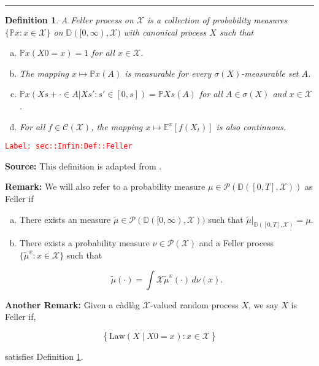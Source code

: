 \documentclass[12pt]{article}
\newcommand{\mb}{\mathbb}
\newcommand{\mc}{\mathcal}
\newcommand{\te}{\text}
\newcommand{\tr}{\textcolor{red}}
\newcommand{\labe}[1]{\tr{\texttt{Label: #1}}}
\newcommand{\lin}{\rule{\linewidth}{0.4 pt}}
\newcommand{\pr}{\mb{P}}							%
\newcommand{\exmu}[2]{\mb{E}^{#1}\left[#2\right]}	%
\newcommand{\cad}{\mb{D}}							%
\newcommand{\T}{T}								%
\newcommand{\x}{x}								%
\renewcommand{\t}{t}							%
\renewcommand{\tt}{s}							%
\newcommand{\ttt}{s'}							%
\newcommand{\X}{X}								%
\newcommand{\f}{f}								%
\newcommand{\cind}[1]{_{#1}}					%
\newcommand{\tip}[1]{#1}						%
\newcommand{\cont}{\mc{C}}						%
\newcommand{\alt}[1]{\widetilde{#1}}			%
\newcommand{\m}{\mu}							%
\newcommand{\mm}{\nu}							%
\newcommand{\law}{\te{Law}}						%
\newcommand{\typset}{A}							%
\newcommand{\spce}{\mc{X}}						%
\newtheorem{defn}[thms]{Definition}
\begin{document}
\lin

\begin{defn}
A Feller process on \(\spce\) is a collection of probability measures \(\{\pr{\x}:\x \in \spce\}\) on \(\cad([0,\infty),\spce)\) with canonical process \(\X\) such that

\begin{enumerate}[(a)]
\item \(\pr{\x}(\X{}{0} = \x) = 1\) for all \(\x \in \spce\).

\item The mapping \(\x \mapsto \pr{\x}(\typset)\) is measurable for every \(\sigma(\X)\)-measurable set \(\typset\).

\item \(\pr{\x}(\X{}{\tt+\cdot} \in \typset|\X{}{\ttt}:\ttt \in [0,\tt]) = \pr{\X{}{\tt}}(\typset)\) for all \(\typset \in \sigma(\X)\) and \(\x \in \spce\).

\item For all \(\f\in \cont(\spce)\), the mapping \(\x\mapsto \exmu{\x}{\f(\X_{\t})}\) is also continuous.
\end{enumerate}
\label{sec::Infin:Def::Feller}
\end{defn}
\labe{sec::Infin:Def::Feller}

\textbf{Source: } This definition is adapted from \cite[Definition 1.1,1.2]{Lig85}.

\textbf{Remark: } We will also refer to a probability measure \(\m \in \mc{P}(\cad([0,\T],\spce))\) as Feller if

\begin{enumerate}[(a)]
\item There exists an measure \(\alt{\m}\in \mc{P}(\cad([0,\infty),\spce))\) such that \(\alt{\m}|_{\cad([0,T],\spce)} = \m\).

\item There exists a probability measure \(\mm\in \mc{P}(\spce)\) and a Feller process \(\{\alt{\m}^\x:\x \in \spce\}\) such that 

\[\alt{\m}(\cdot) = \int{\spce} \alt{\m}^\x(\cdot)\,d\mm(\x).\]
\end{enumerate}

\textbf{Another Remark: } Given a c\`adl\`ag \(\spce\)-valued random process \(\X{}{}\), we say \(\X{}{}\) is Feller if,

\[\left\{\law\left(\X{}{}\middle|\X{}{0} = \x\cind{}\tip{}\right): \x\cind{}\tip{} \in \spce\right\}\]

satisfies Definition \ref{sec::Infin:Def::Feller}.
\end{document}
